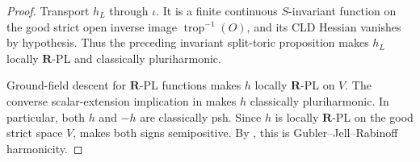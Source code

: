 
\begin{proof}
Transport \(h_L\) through \(\iota\).  It is a finite
continuous \(S\)-invariant function on the good strict open inverse image
\(\operatorname{trop}^{-1}(O)\), and its CLD Hessian vanishes by hypothesis.
Thus the preceding invariant split-toric proposition makes \(h_L\) locally
\(\mathbf R\)-PL and classically pluriharmonic.

Ground-field descent for \(\mathbf R\)-PL functions
\cite[Corollary~5.12]{GJR26} makes \(h\) locally \(\mathbf R\)-PL on
\(V\).  The converse scalar-extension implication in
\cite[Proposition~7.2(6)]{GR25Classical} makes \(h\) classically
pluriharmonic.  In particular, both \(h\) and \(-h\) are classically psh.
Since \(h\) is locally \(\mathbf R\)-PL on the good strict space \(V\),
\cite[Theorem~4.3]{GR25Classical} makes both signs semipositive.  By
\cite[Definition~7.2]{GJR26}, this is Gubler--Jell--Rabinoff harmonicity.
\end{proof}
